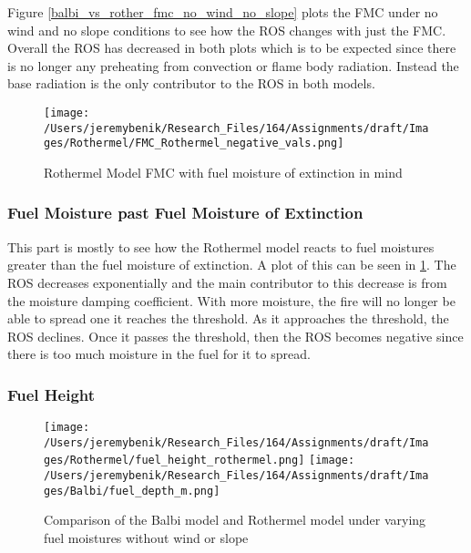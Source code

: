 \documentclass{article}
\begin{document}
\indent Figure \ref{balbi_vs_rother_fmc_no_wind_no_slope} plots the FMC under no wind and no slope conditions to see how the ROS changes with just the FMC. Overall the ROS has decreased in both plots which is to be expected since there is no longer any preheating from convection or flame body radiation. Instead the base radiation is the only contributor to the ROS in both models. 

\begin{figure}
\centering
  \texttt{[image: /Users/jeremybenik/Research\_Files/164/Assignments/draft/Images/Rothermel/FMC\_Rothermel\_negative\_vals.png]}
  \caption{Rothermel Model FMC with fuel moisture of extinction in mind}
  \label{rothermel_neg}
\end{figure}\subsubsection*{Fuel Moisture past Fuel Moisture of Extinction}
\indent This part is mostly to see how the Rothermel model reacts to fuel moistures greater than the fuel moisture of extinction. A plot of this can be seen in \ref{rothermel_neg}. The ROS decreases exponentially and the main contributor to this decrease is from the moisture damping coefficient. With more moisture, the fire will no longer be able to spread one it reaches the threshold. As it approaches the threshold, the ROS declines. Once it passes the threshold, then the ROS becomes negative since there is too much moisture in the fuel for it to spread. 
\subsubsection{Fuel Height}
\begin{figure}
\centering
  \texttt{[image: /Users/jeremybenik/Research\_Files/164/Assignments/draft/Images/Rothermel/fuel\_height\_rothermel.png]}
  \texttt{[image: /Users/jeremybenik/Research\_Files/164/Assignments/draft/Images/Balbi/fuel\_depth\_m.png]}
  \caption{Comparison of the Balbi model and Rothermel model under varying fuel moistures without wind or slope}
  \label{fuel height}
\end{figure}
\end{document}
